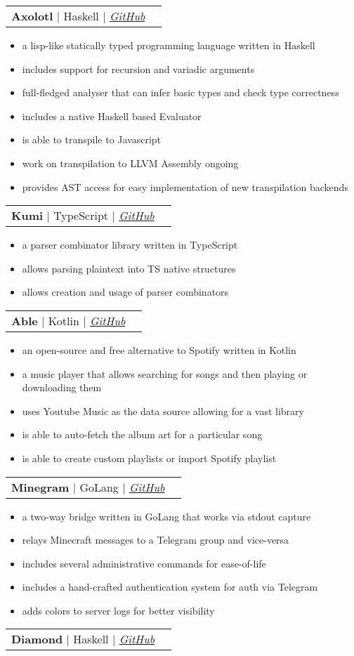 \documentclass[letterpaper,11pt]{article}
\makeatletter
\newcommand{\resumeItem}[1]{
  \item\small{
    {#1 \vspace{-2pt}}
  }
}
\newcommand{\resumeProjectHeading}[2]{
    \item
    \begin{tabular*}{0.97\textwidth}{l@{\extracolsep{\fill}}r}
      \small#1 & #2 \\
    \end{tabular*}\vspace{-7pt}
}
\newcommand{\resumeItemListStart}{\begin{itemize}}
\newcommand{\resumeItemListEnd}{\end{itemize}\vspace{-5pt}}
\makeatother
\begin{document}
      \resumeProjectHeading
        {\textbf{Axolotl} $|$ Haskell $|$ \emph{\href{https://github.com/axolotl-lang/axolotl}{\color{blue}GitHub}}}{}
          \resumeItemListStart
            \resumeItem{a lisp-like statically typed programming language written in Haskell}
            \resumeItem{includes support for recursion and variadic arguments}
            \resumeItem{full-fledged analyser that can infer basic types and check type correctness}
            \resumeItem{includes a native Haskell based Evaluator}
            \resumeItem{is able to transpile to Javascript}
            \resumeItem{work on transpilation to LLVM Assembly ongoing}
            \resumeItem{provides AST access for easy implementation of new transpilation backends}
          \resumeItemListEnd
      \resumeProjectHeading
        {\textbf{Kumi} $|$ TypeScript $|$ \emph{\href{https://github.com/uditkarode/kumi}{\color{blue}GitHub}}}{}
          \resumeItemListStart
            \resumeItem{a parser combinator library written in TypeScript}
            \resumeItem{allows parsing plaintext into TS native structures}
            \resumeItem{allows creation and usage of parser combinators}
          \resumeItemListEnd
      \resumeProjectHeading
        {\textbf{Able} $|$ Kotlin $|$ \emph{\href{https://github.com/uditkarode/AbleMusicPlayer}{\color{blue}GitHub}}}{}
          \resumeItemListStart
            \resumeItem{an open-source and free alternative to Spotify written in Kotlin}
            \resumeItem{a music player that allows searching for songs and then playing or downloading them}
            \resumeItem{uses Youtube Music as the data source allowing for a vast library}
            \resumeItem{is able to auto-fetch the album art for a particular song}
            \resumeItem{is able to create custom playlists or import Spotify playlist}
          \resumeItemListEnd
      \resumeProjectHeading
        {\textbf{Minegram} $|$ GoLang $|$ \emph{\href{https://github.com/uditkarode/Minegram}{\color{blue}GitHub}}}{}
          \resumeItemListStart
            \resumeItem{a two-way bridge written in GoLang that works via stdout capture}
            \resumeItem{relays Minecraft messages to a Telegram group and vice-versa}
            \resumeItem{includes several administrative commands for ease-of-life}
            \resumeItem{includes a hand-crafted authentication system for auth via Telegram}
            \resumeItem{adds colors to server logs for better visibility}
          \resumeItemListEnd
      \resumeProjectHeading
        {\textbf{Diamond} $|$ Haskell $|$ \emph{\href{https://github.com/uditkarode/diamond}{\color{blue}GitHub}}}{}
\end{document}
